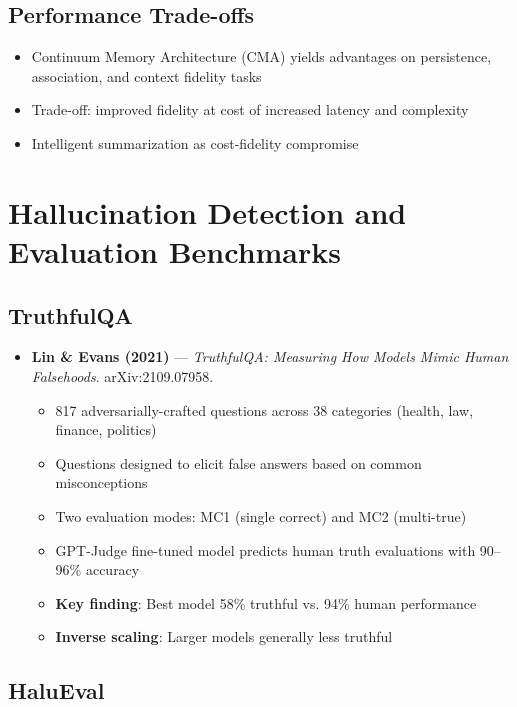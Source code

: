 \documentclass[11pt,letterpaper]{article}
\begin{document}
\subsection{Performance Trade-offs}

\begin{itemize}[leftmargin=*]
\item Continuum Memory Architecture (CMA) yields advantages on persistence, association, and context fidelity tasks
\item Trade-off: improved fidelity at cost of increased latency and complexity
\item Intelligent summarization as cost-fidelity compromise
\end{itemize}

\section{Hallucination Detection and Evaluation Benchmarks}

\subsection{TruthfulQA}

\begin{itemize}[leftmargin=*]
\item \textbf{Lin \& Evans (2021)} --- \textit{TruthfulQA: Measuring How Models Mimic Human Falsehoods}. arXiv:2109.07958.
  \begin{itemize}
  \item 817 adversarially-crafted questions across 38 categories (health, law, finance, politics)
  \item Questions designed to elicit false answers based on common misconceptions
  \item Two evaluation modes: MC1 (single correct) and MC2 (multi-true)
  \item GPT-Judge fine-tuned model predicts human truth evaluations with 90--96\% accuracy
  \item \textbf{Key finding}: Best model 58\% truthful vs. 94\% human performance
  \item \textbf{Inverse scaling}: Larger models generally less truthful
  \end{itemize}
\end{itemize}

\subsection{HaluEval}
\end{document}
